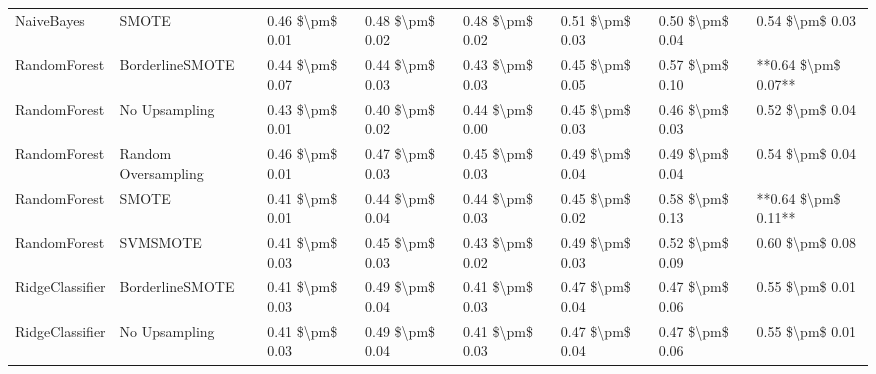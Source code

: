 \begin{tabular}{llllllll}
                     NaiveBayes &                         SMOTE & 0.46 \$\textbackslash pm\$ 0.01 &           0.48 \$\textbackslash pm\$ 0.02 &       0.48 \$\textbackslash pm\$ 0.02 &        0.51 \$\textbackslash pm\$ 0.03 &                         0.50 \$\textbackslash pm\$ 0.04 &     0.54 \$\textbackslash pm\$ 0.03 \\
                   RandomForest &               BorderlineSMOTE & 0.44 \$\textbackslash pm\$ 0.07 &           0.44 \$\textbackslash pm\$ 0.03 &       0.43 \$\textbackslash pm\$ 0.03 &        0.45 \$\textbackslash pm\$ 0.05 &                         0.57 \$\textbackslash pm\$ 0.10 & **0.64 \$\textbackslash pm\$ 0.07** \\
                   RandomForest &                 No Upsampling & 0.43 \$\textbackslash pm\$ 0.01 &           0.40 \$\textbackslash pm\$ 0.02 &       0.44 \$\textbackslash pm\$ 0.00 &        0.45 \$\textbackslash pm\$ 0.03 &                         0.46 \$\textbackslash pm\$ 0.03 &     0.52 \$\textbackslash pm\$ 0.04 \\
                   RandomForest &           Random Oversampling & 0.46 \$\textbackslash pm\$ 0.01 &           0.47 \$\textbackslash pm\$ 0.03 &       0.45 \$\textbackslash pm\$ 0.03 &        0.49 \$\textbackslash pm\$ 0.04 &                         0.49 \$\textbackslash pm\$ 0.04 &     0.54 \$\textbackslash pm\$ 0.04 \\
                   RandomForest &                         SMOTE & 0.41 \$\textbackslash pm\$ 0.01 &           0.44 \$\textbackslash pm\$ 0.04 &       0.44 \$\textbackslash pm\$ 0.03 &        0.45 \$\textbackslash pm\$ 0.02 &                         0.58 \$\textbackslash pm\$ 0.13 & **0.64 \$\textbackslash pm\$ 0.11** \\
                   RandomForest &                      SVMSMOTE & 0.41 \$\textbackslash pm\$ 0.03 &           0.45 \$\textbackslash pm\$ 0.03 &       0.43 \$\textbackslash pm\$ 0.02 &        0.49 \$\textbackslash pm\$ 0.03 &                         0.52 \$\textbackslash pm\$ 0.09 &     0.60 \$\textbackslash pm\$ 0.08 \\
                RidgeClassifier &               BorderlineSMOTE & 0.41 \$\textbackslash pm\$ 0.03 &           0.49 \$\textbackslash pm\$ 0.04 &       0.41 \$\textbackslash pm\$ 0.03 &        0.47 \$\textbackslash pm\$ 0.04 &                         0.47 \$\textbackslash pm\$ 0.06 &     0.55 \$\textbackslash pm\$ 0.01 \\
                RidgeClassifier &                 No Upsampling & 0.41 \$\textbackslash pm\$ 0.03 &           0.49 \$\textbackslash pm\$ 0.04 &       0.41 \$\textbackslash pm\$ 0.03 &        0.47 \$\textbackslash pm\$ 0.04 &                         0.47 \$\textbackslash pm\$ 0.06 &     0.55 \$\textbackslash pm\$ 0.01 \\

\end{tabular}
